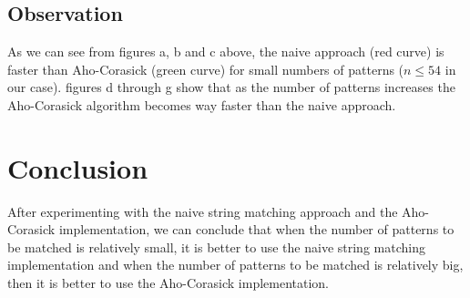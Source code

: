 \documentclass[12pt]{article}
\begin{document}
		\subsection{Observation}
			As we can see from figures a, b and c above, the naive approach (red curve) is faster than Aho-Corasick (green curve) for small numbers of patterns ($n \leq 54$ in our case). figures d through g show that as the number of patterns increases the Aho-Corasick algorithm becomes way faster than the naive approach. 
		
			
	\section{Conclusion}
		After experimenting with the naive string matching approach and the Aho-Corasick implementation, we can conclude that when the number of patterns to be matched is relatively small, it is better to use the naive string matching implementation and when the number of patterns to be matched is relatively big, then it is better to use the Aho-Corasick implementation. 
		
	
\end{document}
